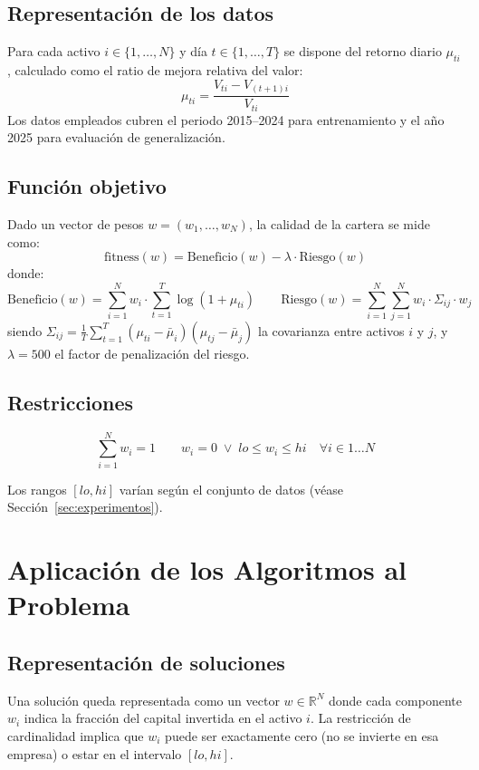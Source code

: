 \documentclass[12pt,a4paper]{article}
\begin{document}
\subsection*{Representación de los datos}

Para cada activo $i \in \{1,\ldots,N\}$ y día $t \in \{1,\ldots,T\}$ se dispone
del retorno diario $\mu_{ti}$, calculado como el ratio de mejora relativa del valor:
\[
  \mu_{ti} = \frac{V_{ti} - V_{(t+1)i}}{V_{ti}}
\]
Los datos empleados cubren el periodo 2015--2024 para entrenamiento y el año 2025
para evaluación de generalización.

\subsection*{Función objetivo}

Dado un vector de pesos $w = (w_1,\ldots,w_N)$, la calidad de la cartera se mide como:
\[
  \text{fitness}(w) = \text{Beneficio}(w) - \lambda \cdot \text{Riesgo}(w)
\]
donde:
\[
  \text{Beneficio}(w) = \sum_{i=1}^{N} w_i \cdot \sum_{t=1}^{T}\log(1+\mu_{ti})
  \qquad
  \text{Riesgo}(w) = \sum_{i=1}^{N}\sum_{j=1}^{N} w_i \cdot \Sigma_{ij} \cdot w_j
\]
siendo $\Sigma_{ij} = \frac{1}{T}\sum_{t=1}^{T}(\mu_{ti}-\bar{\mu}_i)(\mu_{tj}-\bar{\mu}_j)$
la covarianza entre activos $i$ y $j$, y $\lambda = 500$ el factor de penalización
del riesgo.

\subsection*{Restricciones}

\[
  \sum_{i=1}^{N} w_i = 1 \qquad
  w_i = 0 \;\vee\; lo \le w_i \le hi \quad \forall i \in 1\ldots N
\]

Los rangos $[lo, hi]$ varían según el conjunto de datos (véase Sección~\ref{sec:experimentos}).

\section{Aplicación de los Algoritmos al Problema}

\subsection{Representación de soluciones}

Una solución queda representada como un vector $w \in \mathbb{R}^N$
donde cada componente $w_i$ indica la fracción del capital invertida en el activo $i$.
La restricción de cardinalidad implica que $w_i$ puede ser exactamente cero
(no se invierte en esa empresa) o estar en el intervalo $[lo, hi]$.
\end{document}
